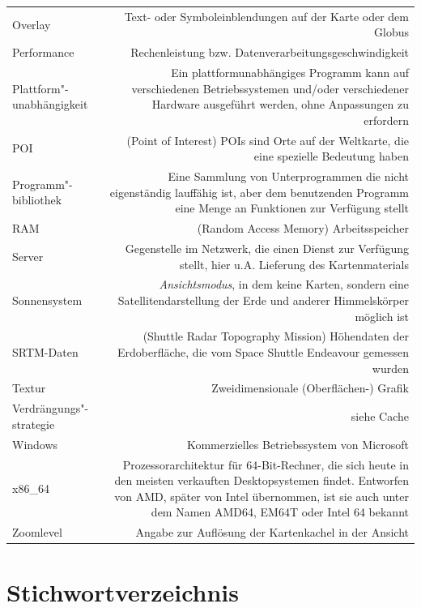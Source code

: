 \documentclass[10pt]{scrreprt}
\newcommand{\textref}[1]{\mbox{\raisebox{0.1ex}{\small$\rightarrow$ }\textit{#1}}}
\begin{document}
\begin{longtabu}{L{0.35} R{1.65}}
Overlay  & Text- oder Symboleinblendungen auf der Karte oder dem Globus\\
Performance & Rechenleistung bzw. Datenverarbeitungsgeschwindigkeit\\
Plattform"-unabhängigkeit & Ein plattformunabhängiges Programm kann auf verschiedenen Betriebssystemen und/oder verschiedener Hardware ausgeführt werden, ohne Anpassungen zu erfordern\\
POI  & (Point of Interest) POIs sind Orte auf der Weltkarte, die eine spezielle Bedeutung haben\\
Programm"-bibliothek & Eine Sammlung von Unterprogrammen die nicht eigenständig lauffähig ist, aber dem benutzenden Programm eine Menge an Funktionen zur Verfügung stellt\\
RAM & (Random Access Memory) Arbeitsspeicher\\
Server & Gegenstelle im Netzwerk, die einen Dienst zur Verfügung stellt, hier u.A. Lieferung des Kartenmaterials\\
Sonnensystem & \textref{Ansichtsmodus}, in dem keine Karten, sondern eine Satellitendarstellung der Erde und anderer Himmelskörper möglich ist\\
SRTM-Daten & (Shuttle Radar Topography Mission) Höhendaten der Erdoberfläche, die vom Space Shuttle Endeavour gemessen wurden\\
Textur & Zweidimensionale (Oberflächen-) Grafik\\
Verdrängungs"-strategie & siehe Cache\\
Windows & Kommerzielles Betriebssystem von Microsoft\\
x86\_64 & Prozessorarchitektur für 64-Bit-Rechner, die sich heute in den meisten verkauften Desktopsystemen findet. Entworfen von AMD, später von Intel übernommen, ist sie auch unter dem Namen AMD64, EM64T oder Intel 64 bekannt\\
Zoomlevel  & Angabe zur Auflösung der Kartenkachel in der Ansicht\\
\end{longtabu}


\cleardoublepage
{}
\chapter*{Stichwortverzeichnis}
\printindex
\end{document}
